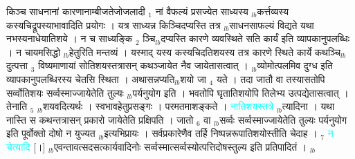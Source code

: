 \documentclass[article,12pt,a4paper]{memoir}%
\newcommand{\quotelemma}[1]{\textcolor{cyan}{#1}}
\newcounter{parCount}
\begin{document}
	  
	  \pstart \leavevmode%
	किञ्च साधनानां कारणानाम्बीजतेजोजलादी {\tiny $_{1}$} नां वैफल्यं प्रसज्येत साध्यस्य {\tiny $_{lb}$}कर्त्तव्यस्य कस्यचिद्रूपस्याभावादिति प्रयोगः । यत्र साध्यन्न किञ्चिदप्यस्ति तत्र {\tiny $_{lb}$}साधनसाफल्यं विद्यते यथा नभस्यनाधेयातिशये । न च साध्यङ्कि {\tiny $_{2}$} ञ्चि{\tiny $_{lb}$}दप्यस्ति कारणे व्यवस्थिते सति कार्यं इति व्यापकानुपलब्धिः । न चायमसिद्धो {\tiny $_{lb}$}हेतुरिति मन्तव्यं । यस्माद् यस्य कस्यचिदतिशयस्य तत्र कारणे स्थिते कार्ये कथञ्चि{\tiny $_{lb}$}दुत्पत्ता {\tiny $_{3}$} विष्यमाणायां सोतिशयस्तत्रासन् कथञ्जायेत नैव जायेतासत्वात् । {\tiny $_{lb}$}व्योमोत्पलमिव दुग्ध इति व्यापकानुपलब्धिरस्य चेतसि स्थिता । अथासन्नप्यति{\tiny $_{lb}$}शयो जा {\tiny $_{4}$} यते । तदा जातौ वा तस्यासतोपि सर्व्वोतिशयः सर्व्वस्माज्जायेतेति तुल्यः {\tiny $_{lb}$}पर्यनुयोग इति । भवतोपि घृतातिशयोपि तिलेभ्य उत्पद्येतासत्वात् । तेनाति {\tiny $_{5}$} {\tiny $_{lb}$}शयवदित्यर्थः । स्वभावहेतुप्रसङ्गः । परमतमाशङ्कते । \quotelemma{नातिशयस्तत्रे} \cite[6a2]{vn-msN} {\tiny $_{lb}$}त्यादिना । यथा नास्ति स कथन्तत्रासन् प्रकारो जायेतेति प्रक्षिपति । जातो {\tiny $_{6}$} वा {\tiny $_{lb}$}सर्व्वः सर्व्वस्माज्जायेतेति तुल्यः पर्यनुयोग इति पूर्वोक्तो दोषो न युज्यत {\tiny $_{lb}$}इत्यभिप्रायः । सर्वप्रकारेणैव तर्हि निष्पन्नरूपातिशयोस्तीति चेदाह । {\tiny $_{7}$} \quotelemma{न चेत्यादि} [।] {\tiny $_{lb}$}एवन्तावत्सदसत्कार्यवादिनोः सर्व्वस्मात्सर्व्वस्योत्पत्तिदोषस्तुल्य इति प्रतिपादितं ।
	{}
	\pend%
      {\tiny $_{lb}$}
\end{document}
